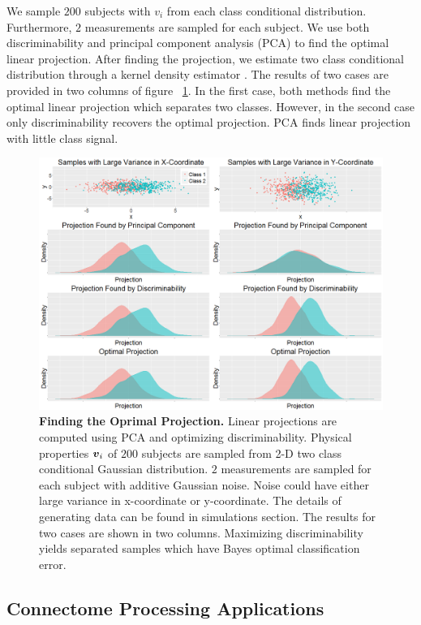 \documentclass{article}
\begin{document}
We sample $200$ subjects with $v_i$ from each class conditional distribution. Furthermore, $2$ measurements are sampled for each subject. We use both discriminability and principal component analysis (PCA) \cite{jolliffe2002principal} to find the optimal linear projection. After finding the projection, we estimate two class conditional distribution through a kernel density estimator \cite{silverman1986density}. The results of two cases are provided in two columns of figure ~\ref{fig:simu2}. In the first case, both methods find the optimal linear projection which separates two classes. However, in the second case only discriminability recovers the optimal projection. PCA finds linear projection with little class signal.
\begin{figure}[ht!]
	\includegraphics[width=\linewidth]{../Figs/simu2.png}
	\caption{{\bf Finding the Oprimal Projection.} Linear projections are computed using PCA and optimizing discriminability. Physical properties $\boldsymbol{v}_i$ of $200$ subjects are sampled from 2-D two class conditional Gaussian distribution. $2$ measurements are sampled for each subject with additive Gaussian noise. Noise could have either large variance in x-coordinate or y-coordinate. The details of generating data can be found in simulations section. The results for two cases are shown in two columns. Maximizing discriminability yields separated samples which have Bayes optimal classification error.}
	\label{fig:simu2}
\end{figure}



\subsection{Connectome Processing Applications}
\end{document}
